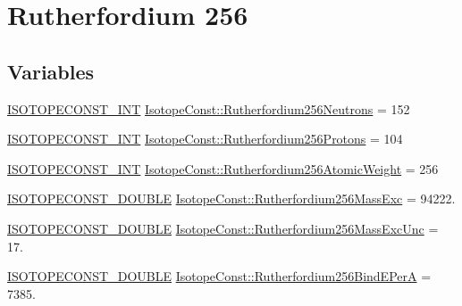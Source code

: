 \hypertarget{group___isotope_const-_rutherfordium-_rf256}{}\section{Rutherfordium 256}
\label{group___isotope_const-_rutherfordium-_rf256}
\subsection*{Variables}
\begin{DoxyCompactItemize}
\item 
\mbox{\hyperlink{group___isotope_const-_macros_ga5f18360b3e99483a35c32d789e62621c}{I\+S\+O\+T\+O\+P\+E\+C\+O\+N\+S\+T\+\_\+\+I\+NT}} \mbox{\hyperlink{group___isotope_const-_rutherfordium-_rf256_ga57e6802466f2870d34ce527cda469576}{Isotope\+Const\+::\+Rutherfordium256\+Neutrons}} = 152
\item 
\mbox{\hyperlink{group___isotope_const-_macros_ga5f18360b3e99483a35c32d789e62621c}{I\+S\+O\+T\+O\+P\+E\+C\+O\+N\+S\+T\+\_\+\+I\+NT}} \mbox{\hyperlink{group___isotope_const-_rutherfordium-_rf256_gaf3d54291743192c187e2b59538371070}{Isotope\+Const\+::\+Rutherfordium256\+Protons}} = 104
\item 
\mbox{\hyperlink{group___isotope_const-_macros_ga5f18360b3e99483a35c32d789e62621c}{I\+S\+O\+T\+O\+P\+E\+C\+O\+N\+S\+T\+\_\+\+I\+NT}} \mbox{\hyperlink{group___isotope_const-_rutherfordium-_rf256_ga24e4177455f374fe2e2314cb0dcb0f0d}{Isotope\+Const\+::\+Rutherfordium256\+Atomic\+Weight}} = 256
\item 
\mbox{\hyperlink{group___isotope_const-_macros_ga8f45a7272ce02c0b4c65c44636ed719a}{I\+S\+O\+T\+O\+P\+E\+C\+O\+N\+S\+T\+\_\+\+D\+O\+U\+B\+LE}} \mbox{\hyperlink{group___isotope_const-_rutherfordium-_rf256_ga14aebf62d24a6bded790e521585e6f2e}{Isotope\+Const\+::\+Rutherfordium256\+Mass\+Exc}} = 94222.
\item 
\mbox{\hyperlink{group___isotope_const-_macros_ga8f45a7272ce02c0b4c65c44636ed719a}{I\+S\+O\+T\+O\+P\+E\+C\+O\+N\+S\+T\+\_\+\+D\+O\+U\+B\+LE}} \mbox{\hyperlink{group___isotope_const-_rutherfordium-_rf256_ga6cb361b48d3e6bde09fdf135b7bc620e}{Isotope\+Const\+::\+Rutherfordium256\+Mass\+Exc\+Unc}} = 17.
\item 
\mbox{\hyperlink{group___isotope_const-_macros_ga8f45a7272ce02c0b4c65c44636ed719a}{I\+S\+O\+T\+O\+P\+E\+C\+O\+N\+S\+T\+\_\+\+D\+O\+U\+B\+LE}} \mbox{\hyperlink{group___isotope_const-_rutherfordium-_rf256_gad28b6297343f379046c66a47e35f7823}{Isotope\+Const\+::\+Rutherfordium256\+Bind\+E\+PerA}} = 7385.

\end{DoxyCompactItemize}
